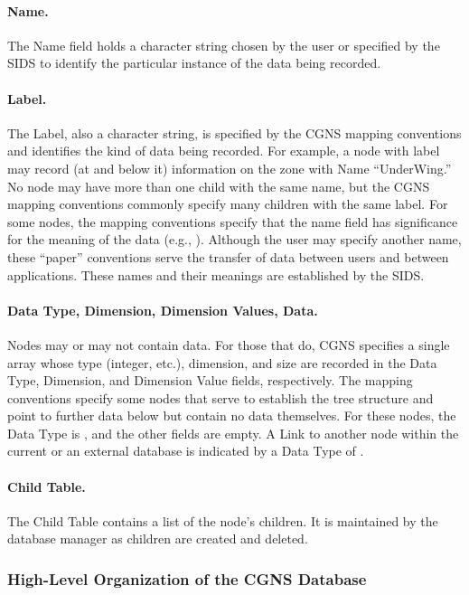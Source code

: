 \paragraph{Name.}
The Name field holds a character string chosen by the user or specified
by the SIDS to identify the particular instance of the data being
recorded.

\paragraph{Label.}
The Label, also a character string, is specified by the CGNS mapping
conventions and identifies the kind of data being recorded.
For example, a node with label  may record (at and below
it) information on the zone with Name ``UnderWing.''
No node may have more than one child
with the same name, but the CGNS mapping conventions commonly specify
many children with the same label.
For some nodes, the mapping conventions specify that the name
field has significance for the meaning of the data (e.g.,
).
Although the user may specify another name, these ``paper'' conventions
serve the transfer of data between users and between applications.
These names and their meanings are established by the SIDS.

\paragraph{Data Type, Dimension, Dimension Values, Data.}
Nodes may or may not contain data.
For those that do, CGNS specifies a single array whose type (integer,
etc.), dimension, and size are recorded in the Data Type, Dimension, and
Dimension Value fields, respectively.
The mapping conventions specify some nodes that serve to establish the
tree structure and point to further data below but contain no data
themselves.
For these nodes, the Data Type is , and the other fields are
empty. A Link to another node within the current or an external
database is indicated by a Data Type of .

\paragraph{Child Table.}
The Child Table contains a list of the node's children.
It is maintained by the database manager as children are created and deleted.

\subsubsection{High-Level Organization of the CGNS Database}

